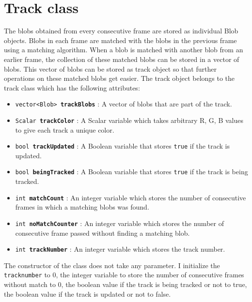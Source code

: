\documentclass[a4paper]{aitthesis}
\begin{document}
 \section{Track class}
 The blobs obtained from every consecutive frame are stored as individual Blob objects. Blobs in each frame are matched with the blobs in the previous frame using a matching algorithm. When a blob is matched with another blob from an earlier frame, the collection of these matched blobs can be stored in a vector of blobs. This vector of blobs can be stored as track object so that further operations on these matched blobs get easier. The track object belongs to the track class which has the following attributes:
 \begin{itemize}
 \item \texttt{vector<Blob> \textbf{trackBlobs}} :  A vector of blobs that are part of the track.
 \item \texttt{Scalar \textbf{trackColor}} : A Scalar variable which takes arbitrary R, G, B values to give each track a unique color.
 \item \texttt{bool \textbf{trackUpdated}} : A Boolean variable that stores \texttt{true} if the track is updated.
 \item \texttt{bool \textbf{beingTracked}} : A Boolean variable that stores \texttt{true} if the track is being tracked.
 \item \texttt{int \textbf{matchCount}} : An integer variable which stores the number of consecutive frames in which a matching blobs was found.
 \item \texttt{int \textbf{noMatchCounter}} : An integer variable which stores the number of consecutive frame passed without finding a matching blob.
 \item \texttt{int \textbf{trackNumber}} : An integer variable which stores the track number.

\end{itemize}  
The constructor of the class does not take any parameter. I initialize the \texttt{tracknumber} to 0, the integer variable to store the number of consecutive frames without match to 0, the boolean value if the track is being tracked or not to true, the boolean value if the track is updated or not to false.
\end{document}
